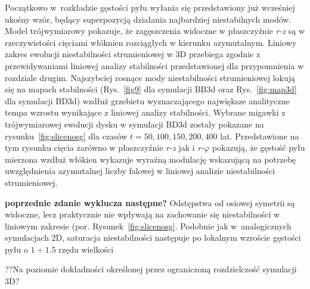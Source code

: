 Początkowo w~rozkładzie gęstości pyłu wyłania się przedstawiony już wcześniej
ukośny wzór, będący superpozycją działania najbardziej niestabilnych modów.
Model trójwymiarowy pokazuje, że zagęszczenia widoczne w płaszczyźnie
\textit{r-z} są w rzeczywistości cięciami włóknien rozciągłych w kierunku
azymutalnym. Liniowy zakres ewolucji niestabilności strumieniowej w 3D przebiega
zgodnie z przewidywaniami liniowej analizy stabilności przedstawionej dla
przypomnienia w rozdziale drugim. Najszybciej rosnące mody niestabilności
strumieniowej lokują się na mapach stabilności (Rys.~\ref{fig9} dla symulacji
BB3d oraz Rys.~\ref{fig:map3d} dla symulacji BD3d) wzdłuż grzebietu
wyznaczającego największe analityczne tempa wzrostu wynikające z liniowej
analizy stabilności. Wybrane migawki z trójwymiarowej
ewolucji dysku w symulacji BD3d zostały pokazane na rysunku~\ref{fig:slicenosg}
dla czasów $t =  50, 100, 150, 200, 400$ lat. Przedstawione na tym rysunku
cięcia zarówno w płaszczyźnie \textit{r-z} jak i \textit{r-}$\varphi$ pokazują, że
gęstość pyłu mierzona wzdłuż włókien wykazuje wyraźną modulację wskazującą na
potrzebę uwzględnienia azymutalnej liczby falowej w liniowej analizie
niestabilności strumieniowej. 

{\bf poprzednie zdanie wyklucza następne?}
Odstępstwa od osiowej symetrii są widoczne, lecz praktycznie nie
wpływają na zachowanie się niestabilności w liniowym zakresie (por.
Rysunek~\ref{fig:slicenosg}. Podobnie jak w~analogicznych symulacjach 2D,
saturacja niestabilności następuje po lokalnym wzroście gęstości pyłu o
$1\div1.5$ rzędu wielkości

??Na poziomie dokładności określonej przez ograniczoną rozdzielczość symulacji 3D?

